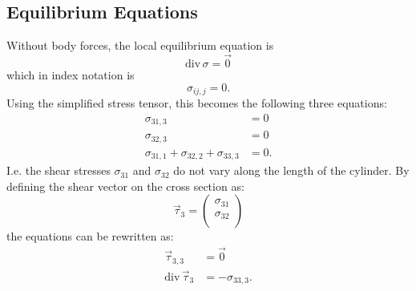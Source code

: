 \subsection{Equilibrium Equations}
Without body forces, the local equilibrium equation is
\begin{equation*}
  \mathrm{div}\, \sigma = \Vec{0}
\end{equation*}
which in index notation is
\begin{equation*}
  \sigma_{ij,j} = 0
.\end{equation*}
Using the simplified stress tensor, this becomes the following three equations:
\begin{align*}
  \sigma_{31,3} &= 0 \\
  \sigma_{32,3} &= 0 \\
  \sigma_{31,1} + \sigma_{32,2} + \sigma_{33,3} &= 0
.\end{align*}
I.e. the shear stresses $\sigma_{31}$ and $\sigma_{32}$ do not vary along the length of the cylinder.
By defining the shear vector on the cross section as:
\begin{equation*}
  \Vec{\tau}_3 = \begin{pmatrix}
    \sigma_{31}\\
  \sigma_{32}\\
  \end{pmatrix}
\end{equation*}
the equations can be rewritten as:
\begin{align*}
  \Vec{\tau}_{3,3} &= \Vec{0} \\
  \mathrm{div}\, \Vec{\tau}_3 &= - \sigma_{33,3}
.\end{align*}

